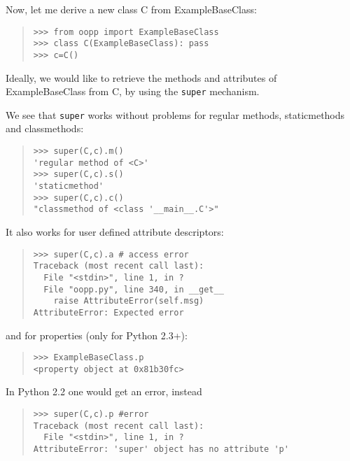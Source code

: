 \documentclass[10pt,english]{article}
\begin{document}
Now, let me derive a new class C from ExampleBaseClass:
\begin{quote}
\begin{verbatim}>>> from oopp import ExampleBaseClass
>>> class C(ExampleBaseClass): pass
>>> c=C()\end{verbatim}
\end{quote}

Ideally, we would like to retrieve the methods and attributes of 
ExampleBaseClass from C, by using the \texttt{super} mechanism.
\begin{list}{.}
{
\setlength{\rightmargin}{\leftmargin}
}
\item {} 
We see that \texttt{super} works without problems for regular methods, 
staticmethods and classmethods:

\end{list}
\begin{quote}
\begin{verbatim}>>> super(C,c).m()
'regular method of <C>'
>>> super(C,c).s()
'staticmethod'
>>> super(C,c).c()
"classmethod of <class '__main__.C'>"\end{verbatim}
\end{quote}

It also works for user defined attribute descriptors:
\begin{quote}
\begin{verbatim}>>> super(C,c).a # access error
Traceback (most recent call last):
  File "<stdin>", line 1, in ?
  File "oopp.py", line 340, in __get__
    raise AttributeError(self.msg)
AttributeError: Expected error\end{verbatim}
\end{quote}

and for properties (only for Python 2.3+):
\begin{quote}
\begin{verbatim}>>> ExampleBaseClass.p
<property object at 0x81b30fc>\end{verbatim}
\end{quote}

In Python 2.2 one would get an error, instead
\begin{quote}
\begin{verbatim}>>> super(C,c).p #error
Traceback (most recent call last):
  File "<stdin>", line 1, in ?
AttributeError: 'super' object has no attribute 'p'\end{verbatim}
\end{quote}
\end{document}
